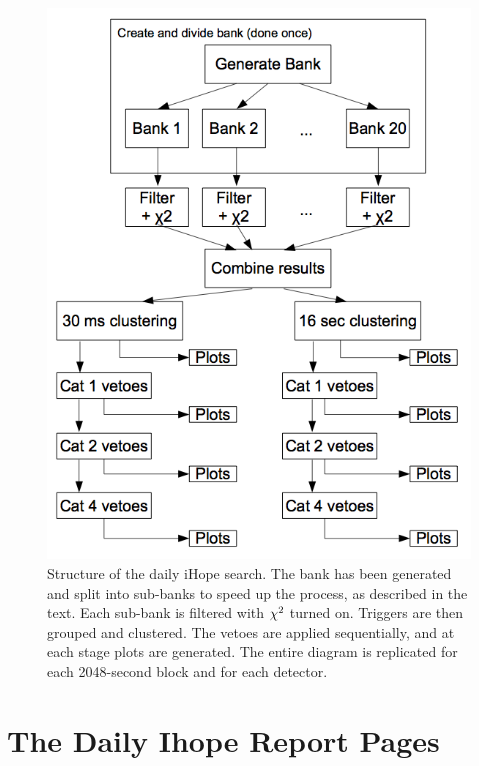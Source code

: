 \begin{figure}
  \includegraphics[width=\linewidth]{figures/detchar/daily_flowchart}
  \caption[Structure of the daily iHope search]{
  \label{f:daily_flowchart}
Structure of the daily iHope search.  The bank has been generated and
split into sub-banks to speed up the process, as described in the
text.  Each sub-bank is filtered with $\chi^2$ turned on.  Triggers
are then grouped and clustered.  The vetoes are applied sequentially,
and at each stage plots are generated.  The entire diagram is
replicated for each 2048-second block and for each detector.}
\end{figure}%




\section{The Daily Ihope Report Pages}
\label{sec:daily_pages}

